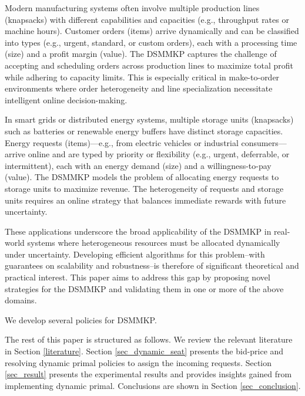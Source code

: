 Modern manufacturing systems often involve multiple production lines (knapsacks) with different capabilities and capacities (e.g., throughput rates or machine hours). Customer orders (items) arrive dynamically and can be classified into types (e.g., urgent, standard, or custom orders), each with a processing time (size) and a profit margin (value). The DSMMKP captures the challenge of accepting and scheduling orders across production lines to maximize total profit while adhering to capacity limits. This is especially critical in make-to-order environments where order heterogeneity and line specialization necessitate intelligent online decision-making.


In smart grids or distributed energy systems, multiple storage units (knapsacks) such as batteries or renewable energy buffers have distinct storage capacities. Energy requests (items)—e.g., from electric vehicles or industrial consumers—arrive online and are typed by priority or flexibility (e.g., urgent, deferrable, or intermittent), each with an energy demand (size) and a willingness-to-pay (value). The DSMMKP models the problem of allocating energy requests to storage units to maximize revenue. The heterogeneity of requests and storage units requires an online strategy that balances immediate rewards with future uncertainty.



These applications underscore the broad applicability of the DSMMKP in real-world systems where heterogeneous resources must be allocated dynamically under uncertainty. Developing efficient algorithms for this problem--with guarantees on scalability and robustness--is therefore of significant theoretical and practical interest. This paper aims to address this gap by proposing novel strategies for the DSMMKP and validating them in one or more of the above domains.




We develop several policies for DSMMKP. 

The rest of this paper is structured as follows. We review the relevant literature in Section \ref{literature}. Section \ref{sec_dynamic_seat} presents the bid-price and resolving dynamic primal policies to assign the incoming requests. Section \ref{sec_result} presents the experimental results and provides insights gained from implementing dynamic primal. Conclusions are shown in Section \ref{sec_conclusion}.